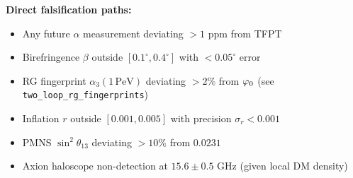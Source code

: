 \begin{tcolorbox}[colback=gray!5, colframe=gray!60, title={\textbf{Claim Map: What This Paper Establishes}}, fonttitle=\bfseries]
\textbf{Direct falsification paths:}
\begin{itemize}[leftmargin=1.5em, topsep=2pt, itemsep=1pt]
    \item Any future $\alpha$ measurement deviating $>1$ ppm from TFPT
    \item Birefringence $\beta$ outside $[0.1^\circ, 0.4^\circ]$ with $<0.05^\circ$ error
    \item RG fingerprint $\alpha_3(1\,\mathrm{PeV})$ deviating $>2\%$ from $\varphi_0$ (see \texttt{two\_loop\_rg\_fingerprints})
    \item Inflation $r$ outside $[0.001, 0.005]$ with precision $\sigma_r < 0.001$
    \item PMNS $\sin^2\theta_{13}$ deviating $>10\%$ from $0.0231$
    \item Axion haloscope non-detection at $15.6 \pm 0.5$ GHz (given local DM density)
\end{itemize}
\end{tcolorbox}


